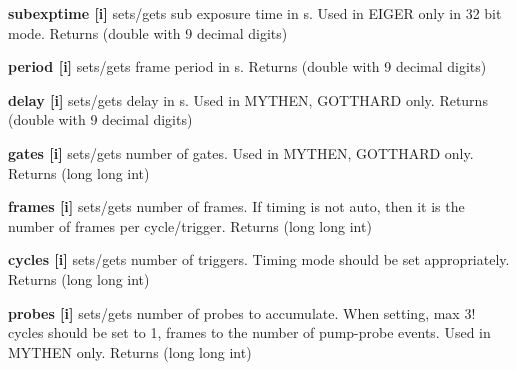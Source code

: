 \begin{DoxyItemize}
\item {\bfseries subexptime \mbox{[}i\mbox{]}} sets/gets sub exposure time in s. Used in EIGER only in 32 bit mode. {\ttfamily Returns} {\ttfamily }(double with 9 decimal digits)
\end{DoxyItemize}


\begin{DoxyItemize}
\item {\bfseries period \mbox{[}i\mbox{]}} sets/gets frame period in s. {\ttfamily Returns} {\ttfamily }(double with 9 decimal digits)
\end{DoxyItemize}


\begin{DoxyItemize}
\item {\bfseries delay \mbox{[}i\mbox{]}} sets/gets delay in s. Used in MYTHEN, GOTTHARD only. {\ttfamily Returns} {\ttfamily }(double with 9 decimal digits)
\end{DoxyItemize}


\begin{DoxyItemize}
\item {\bfseries gates \mbox{[}i\mbox{]}} sets/gets number of gates. Used in MYTHEN, GOTTHARD only. {\ttfamily Returns} {\ttfamily }(long long int)
\end{DoxyItemize}


\begin{DoxyItemize}
\item {\bfseries frames \mbox{[}i\mbox{]}} sets/gets number of frames. If {\ttfamily timing} is not {\ttfamily auto}, then it is the number of frames per cycle/trigger. {\ttfamily Returns} {\ttfamily }(long long int)
\end{DoxyItemize}


\begin{DoxyItemize}
\item {\bfseries cycles \mbox{[}i\mbox{]}} sets/gets number of triggers. Timing mode should be set appropriately. {\ttfamily Returns} {\ttfamily }(long long int)
\end{DoxyItemize}


\begin{DoxyItemize}
\item {\bfseries probes \mbox{[}i\mbox{]}} sets/gets number of probes to accumulate. When setting, max 3! cycles should be set to 1, frames to the number of pump-\/probe events. Used in MYTHEN only. {\ttfamily Returns} {\ttfamily }(long long int)
\end{DoxyItemize}


